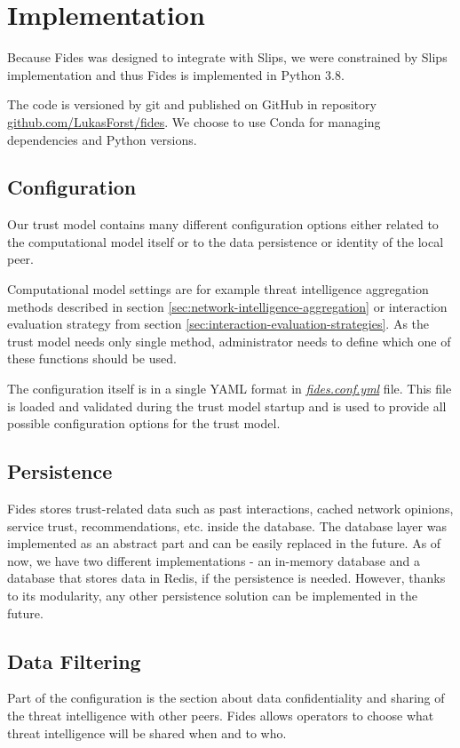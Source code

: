 \section{Implementation}
\label{sec:implementation}
Because Fides was designed to integrate with Slips, we were constrained by Slips implementation and thus Fides is implemented in Python 3.8.

The code is versioned by git and published on GitHub in repository \href{https://github.com/LukasForst/fides}{github.com/LukasForst/fides}.
We choose to use Conda \cite{conda} for managing dependencies and Python versions.

\subsection{Configuration}
\label{subsec:configuration}
Our trust model contains many different configuration options either related to the computational model itself or to the data persistence or identity of the local peer.

Computational model settings are for example threat intelligence aggregation methods described in section \ref{sec:network-intelligence-aggregation} or interaction evaluation strategy from section \ref{sec:interaction-evaluation-strategies}.
As the trust model needs only single method, administrator needs to define which one of these functions should be used.

The configuration itself is in a single YAML \cite{yaml} format in \href{https://github.com/LukasForst/fides/blob/master/fides.conf.yml}{\textit{fides.conf.yml}} file.
This file is loaded and validated during the trust model startup and is used to provide all possible configuration options for the trust model.

\subsection{Persistence}
\label{subsec:persistence}
Fides stores trust-related data such as past interactions, cached network opinions, service trust, recommendations, etc. inside the database.
The database layer was implemented as an abstract part and can be easily replaced in the future.
As of now, we have two different implementations - an in-memory database and a database that stores data in Redis, if the persistence is needed.
However, thanks to its modularity, any other persistence solution can be implemented in the future.

\subsection{Data Filtering}
\label{subsec:data-filtering}
Part of the configuration is the section about data confidentiality and sharing of the threat intelligence with other peers.
Fides allows operators to choose what threat intelligence will be shared when and to who.

